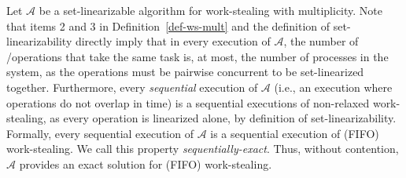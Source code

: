 
Let \(\mathcal A\) be a set-linearizable algorithm for work-stealing with multiplicity.  Note that items 2 and 3 in Definition~\ref{def-ws-mult} and the definition of set-linearizability directly imply that in every execution of \(\mathcal A\), the number of \Take/\Steal operations that take the same task is, at most, the number of processes in the system, as the operations must be pairwise concurrent to be set-linearized together. Furthermore, every \emph{sequential} execution of \(\mathcal A\) (i.e., an execution where operations do not overlap in time) is a sequential executions of non-relaxed work-stealing, as every operation is linearized alone, by definition of set-linearizability. Formally, every sequential execution of \(\mathcal A\) is a sequential execution of (FIFO) work-stealing. We call this property \emph{sequentially-exact}.  Thus, without contention, \(\mathcal A\) provides an exact solution for (FIFO) work-stealing.

